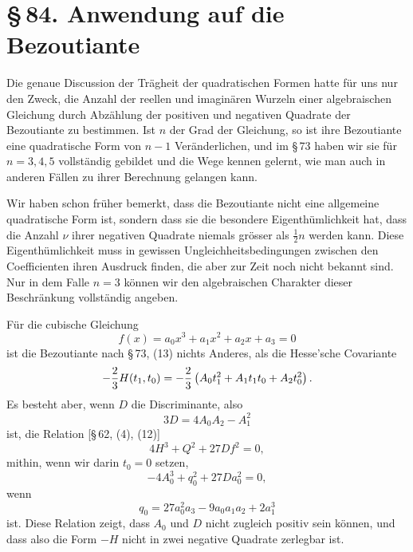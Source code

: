 \documentclass[11pt]{article}
\providecommand{\sect}[2]{\section*{\S\,#1. #2}}
\begin{document}
\sect{84}{Anwendung auf die Bezoutiante}

Die genaue Discussion der Tr\"agheit der quadratischen Formen hatte f\"ur uns nur den Zweck, die Anzahl der reellen und imagin\"aren Wurzeln einer algebraischen Gleichung durch Abz\"ahlung der positiven und negativen Quadrate der Bezoutiante zu bestimmen. Ist $n$ der Grad der Gleichung, so ist ihre Bezoutiante eine quadratische Form von $n-1$ Ver\"anderlichen, und im \S\,73 haben wir sie f\"ur $n=3,4,5$ vollst\"andig gebildet und die Wege kennen gelernt, wie man auch in anderen F\"allen zu ihrer Berechnung gelangen kann.

Wir haben schon fr\"uher bemerkt, dass die Bezoutiante nicht eine allgemeine quadratische Form ist, sondern dass sie die besondere Eigenth\"umlichkeit hat, dass die Anzahl $\nu$ ihrer negativen Quadrate niemals gr\"osser als $\frac12 n$ werden kann. Diese Eigenth\"umlichkeit muss in gewissen Ungleichheitsbedingungen zwischen den Coefficienten ihren Ausdruck finden, die aber zur Zeit noch nicht bekannt sind. Nur in dem Falle $n=3$ k\"onnen wir den algebraischen Charakter dieser Beschr\"ankung vollst\"andig angeben.

F\"ur die cubische Gleichung
\[
        f(x)=a_0x^3+a_1x^2+a_2x+a_3=0
\]
ist die Bezoutiante nach \S\,73, (13) nichts Anderes, als die Hesse'sche Covariante
\[
        -{2\over3}H(t_1,t_0)=-{2\over3}\left(A_0t_1^2+A_1t_1t_0+A_2t_0^2\right).
\]
Es besteht aber, wenn $D$ die Discriminante, also
\[
        3D=4A_0A_2-A_1^2
\]
ist, die Relation [\S\,62, (4), (12)]
\[
        4H^3+Q^2+27Df^2=0,
\]
mithin, wenn wir darin $t_0=0$ setzen,
\begin{equation}
        -4A_0^3+q_0^2+27Da_0^2=0,
\tag{1}
\end{equation}
wenn
\[
        q_0=27a_0^2a_3-9a_0a_1a_2+2a_1^3
\]
ist. Diese Relation zeigt, dass $A_0$ und $D$ nicht zugleich positiv sein k\"onnen, und dass also die Form $-H$ nicht in zwei negative Quadrate zerlegbar ist.
\end{document}
